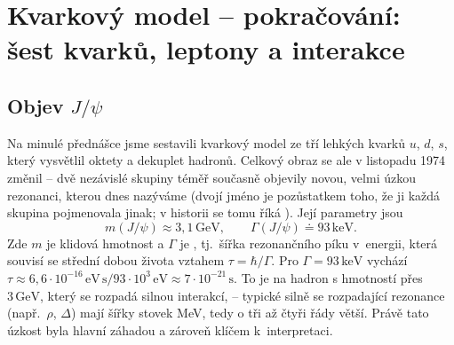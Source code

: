 
\section{Kvarkový model -- pokračování: šest kvarků, leptony a interakce}

\subsection{Objev \texorpdfstring{$J/\psi$}{J/psi}}

Na minulé přednášce jsme sestavili kvarkový model ze tří lehkých kvarků $u$, $d$, $s$, který vysvětlil oktety a dekuplet hadronů. Celkový obraz se ale v listopadu 1974 změnil -- dvě nezávislé skupiny téměř současně objevily novou, velmi úzkou rezonanci, kterou dnes nazýváme  (dvojí jméno je pozůstatkem toho, že ji každá skupina pojmenovala jinak; v historii se tomu říká ). Její parametry jsou
\begin{equation}
  m(J/\psi) \approx 3{,}1\,\mathrm{GeV}, \qquad \Gamma(J/\psi) \doteq 93\,\mathrm{keV}.
\end{equation}
Zde $m$ je klidová hmotnost a $\Gamma$ je , tj.\ šířka rezonančního píku v~energii, která souvisí se střední dobou života vztahem $\tau = \hbar/\Gamma$. Pro $\Gamma = 93\,\mathrm{keV}$ vychází $\tau \approx 6{,}6\cdot 10^{-16}\,\mathrm{eV\,s}/93\cdot10^{3}\,\mathrm{eV}\approx 7\cdot 10^{-21}\,\mathrm{s}$. To je na hadron s hmotností přes $3\,\mathrm{GeV}$, který se rozpadá silnou interakcí,  -- typické silně se rozpadající rezonance (např.\ $\rho$, $\Delta$) mají šířky stovek MeV, tedy o tři až čtyři řády větší. Právě tato úzkost byla hlavní záhadou a zároveň klíčem k~interpretaci.


